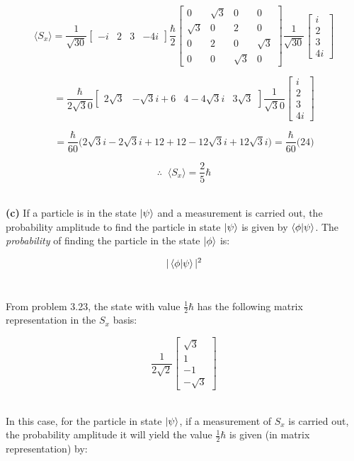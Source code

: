 \documentclass[9pt]{extarticle}
\begin{document}
\begin{multicols*}{2}
$$
\langle S_x \rangle = 
\frac{1}{\sqrt{30}} 
\begin{bmatrix}
        -i & 2 & 3 & -4i
\end{bmatrix}
\frac \hbar 2
\begin{bmatrix}
        0 & \sqrt 3 & 0 & 0 \\
        \sqrt 3 & 0 & 2 & 0 \\
        0 & 2 & 0 & \sqrt 3 \\
        0 & 0 & \sqrt 3 & 0
\end{bmatrix}
\frac{1}{\sqrt{30}}
\begin{bmatrix}
        i \\
        2 \\
        3 \\
        4i
\end{bmatrix}
$$

$$
= \frac{\hbar}{2 \sqrt 30}
\begin{bmatrix}
	2 \sqrt 3 & -\sqrt 3 i + 6 & 4 - 4\sqrt 3 i & 3\sqrt 3
\end{bmatrix}
\frac{1}{\sqrt 30} 
\begin{bmatrix}
        i \\
        2 \\
        3 \\
        4i
\end{bmatrix}
$$

$$= \frac{\hbar}{60} \bigg( 2 \sqrt 3 i - 2 \sqrt 3 i + 12 + 12 - 12\sqrt 3 i + 12 \sqrt 3 i \bigg) = \frac{\hbar}{60} \big( 24 \big)$$ 

$$\therefore \;\; \langle S_x \rangle = \frac 25 \hbar$$ \ 

{\bf (c)} If a particle is in the state $\ket{\psi}$ and a measurement is carried out, the probability amplitude to find the particle in state $\ket{\psi}$ is given by $\bra{\phi}\ket{\psi}$. The {\it probability} of finding the particle in the state $\ket{\phi}$ is:

$$| \bra{\phi}\ket{\psi} |^2$$ \ 

From problem 3.23, the state with value $\frac 12 \hbar$ has the following matrix representation in the $S_x$ basis:

$$
\frac{1}{2\sqrt 2}
\begin{bmatrix}
	\sqrt 3 \\ 
	1 \\ 
	-1 \\ 
	-\sqrt 3
\end{bmatrix}
$$ \ 

In this case, for the particle in state $\ket{\psi}$, if a measurement of $S_x$ is carried out, the probability amplitude it will yield the value $\frac 12 \hbar$ is given (in matrix representation) by:


\end{multicols*}
\end{document}
